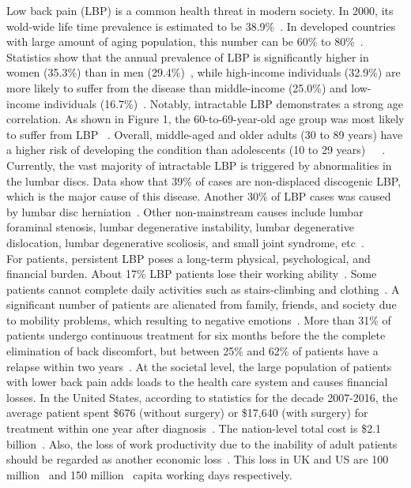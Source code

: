 \documentclass[12pt]{extbook}
\begin{document}
Low back pain (LBP) is a common health threat in modern society. In 2000, its wold-wide life time prevalence is estimated to be 38.9\%~\cite{hoy2012systematic}. In developed countries with large amount of aging population, this number can be 60\% to 80\%~\cite{vos2012years}. Statistics show that the annual prevalence of LBP is significantly higher in women (35.3\%) than in men (29.4\%)~\cite{hoy2012systematic}, while high-income individuals (32.9\%) are more likely to suffer from the disease than middle-income (25.0\%) and low-income individuals (16.7\%)~\cite{hoy2012systematic}. Notably, intractable LBP demonstrates a strong age correlation. As shown in Figure 1, the 60-to-69-year-old age group was most likely to suffer from LBP ~\cite{hoy2012systematic}. Overall, middle-aged and older adults (30 to 89 years) have a higher risk of developing the condition than adolescents (10 to 29 years)~\cite{hoy2012systematic}~\cite{taimela1997prevalence}~\cite{manchikanti2009comprehensive}.\\

Currently, the vast majority of intractable LBP is triggered by abnormalities in the lumbar discs. Data show that 39\% of cases are non-displaced discogenic LBP, which is the major cause of this disease. Another 30\% of LBP cases was caused by lumbar disc herniation~\cite{grabovac2019association}. Other non-mainstream causes include lumbar foraminal stenosis, lumbar degenerative instability, lumbar degenerative dislocation, lumbar degenerative scoliosis, and small joint syndrome, etc~\cite{makris2017physical}.\\

For patients, persistent LBP poses a long-term physical, psychological, and financial burden. About 17\% LBP patients lose their working ability~\cite{hoy2012systematic}. Some patients cannot complete daily activities such as stairs-climbing and clothing~\cite{casazza2012diagnosis}. A significant number of patients are alienated from family, friends, and society due to mobility problems, which resulting to negative emotions~\cite{kim2019expenditures}. More than 31\% of patients undergo continuous treatment for six months before the the complete elimination of back discomfort, but between 25\% and 62\% of patients have a relapse within two years~\cite{pinheiro2015advanced}. At the societal level, the large population of patients with lower back pain adds loads to the health care system and causes financial losses. In the United States, according to statistics for the decade 2007-2016, the average patient spent \$676 (without surgery) or \$17,640 (with surgery) for treatment within one year after diagnosis~\cite{wolfe1995prevalence}. The nation-level total cost is \$2.1 billion~\cite{wolfe1995prevalence}. Also, the loss of work productivity due to the inability of adult patients should be regarded as another economic loss~\cite{guo1999back}. This loss in UK and US are 100 million~\cite{zhang2009clinical} and 150 million~\cite{herkowitz2011rothman} capita working days respectively.
\end{document}
